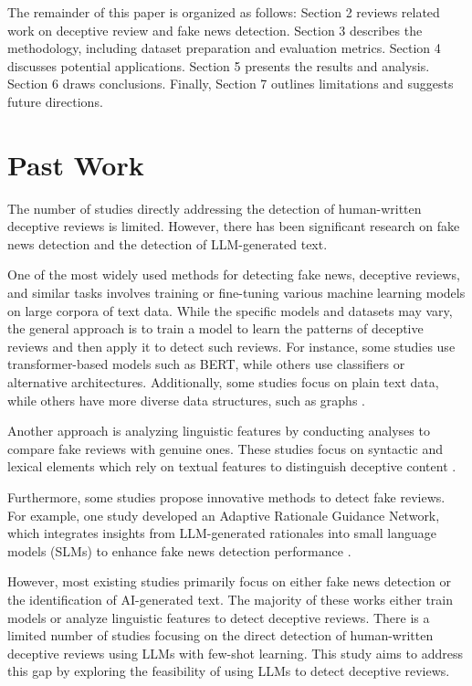 \documentclass[sigconf, nonacm]{acmart}
\theoremstyle{definition}
\begin{document}
The remainder of this paper is organized as follows: Section 2 reviews related work on deceptive review and fake news detection. Section 3 describes the methodology, including dataset preparation and evaluation metrics. Section 4 discusses potential applications. Section 5 presents the results and analysis. Section 6 draws conclusions. Finally, Section 7 outlines limitations and suggests future directions.

\section{Past Work}
The number of studies directly addressing the detection of human-written deceptive reviews is limited. However, there has been significant research on fake news detection and the detection of LLM-generated text.

One of the most widely used methods for detecting fake news, deceptive reviews, and similar tasks involves training or fine-tuning various machine learning models on large corpora of text data. While the specific models and datasets may vary, the general approach is to train a model to learn the patterns of deceptive reviews and then apply it to detect such reviews. For instance, some studies use transformer-based models such as BERT, while others use classifiers or alternative architectures. Additionally, some studies focus on plain text data, while others have more diverse data structures, such as graphs \cite{liyanage-etal-2024-detecting, ott-etal-2011-finding, SALMINEN2022102771, ignat2024maideupmultilingualdeceptiondetection, 8259828}.

Another approach is analyzing linguistic features by conducting analyses to compare fake reviews with genuine ones. These studies focus on syntactic and lexical elements which rely on textual features to distinguish deceptive content \cite{ignat2024maideupmultilingualdeceptiondetection, 8259828, abri2020fakereviewsdetectionanalysis}.

Furthermore, some studies propose innovative methods to detect fake reviews. For example, one study developed an Adaptive Rationale Guidance Network, which integrates insights from LLM-generated rationales into small language models (SLMs) to enhance fake news detection performance \cite{Hu_2024}.

However, most existing studies primarily focus on either fake news detection or the identification of AI-generated text. The majority of these works either train models or analyze linguistic features to detect deceptive reviews. There is a limited number of studies focusing on the direct detection of human-written deceptive reviews using LLMs with few-shot learning. This study aims to address this gap by exploring the feasibility of using LLMs to detect deceptive reviews.
\end{document}
